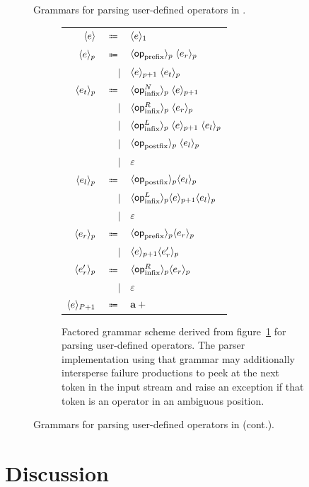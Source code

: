 {\begin{figure}[H]
\begin{subfigure}{\linewidth}
{}
\label{figure:user-defined-operators-initial-grammar-scheme}
\end{subfigure}
\caption[Grammars for parsing user-defined operators in \Beluga.]{Grammars for parsing user-defined operators in \Beluga.}
\label{figure:user-defined-operators-grammar}
\end{figure}%
\begin{figure}\ContinuedFloat
\begin{subfigure}{\linewidth}
\centering
\begin{tabular}{rrl}
$ \langle e\rangle $ & $ \Coloneqq $ & $ \langle e\rangle_1 $\\
$ \langle e\rangle_p $ & $ \Coloneqq $ & $ \langle\mathsf{op}_{\text{prefix}}\rangle_p \; \langle e_r\rangle_p $\\
& $ \mid $ & $ \langle e\rangle_{p + 1} \; \langle e_t\rangle_p $\\
$ \langle e_t\rangle_p $ & $ \Coloneqq $ & $ \langle\mathsf{op}_{\text{infix}}^N\rangle_p \; \langle e\rangle_{p + 1} $\\
& $ \mid $ & $ \langle\mathsf{op}_{\text{infix}}^R\rangle_p \; \langle e_r\rangle_p $\\
& $ \mid $ & $ \langle\mathsf{op}_{\text{infix}}^L\rangle_p \; \langle e\rangle_{p + 1} \; \langle e_l\rangle_p $\\
& $ \mid $ & $ \langle\mathsf{op}_{\text{postfix}}\rangle_p \; \langle e_l\rangle_p $\\
& $ \mid $ & $ \varepsilon $\\
$ \langle e_l\rangle_p $ & $ \Coloneqq $ & $ \langle\mathsf{op}_{\text{postfix}}\rangle_p \langle e_l\rangle_p $\\
& $ \mid $ & $ \langle\mathsf{op}_{\text{infix}}^L\rangle_p \langle e\rangle_{p + 1} \langle e_l\rangle_p $\\
& $ \mid $ & $ \varepsilon $\\
$ \langle e_r\rangle_p $ & $ \Coloneqq $ & $ \langle\mathsf{op}_{\text{prefix}}\rangle_p \langle e_r\rangle_p $\\
& $ \mid $ & $ \langle e\rangle_{p + 1} \langle e_r'\rangle_p $\\
$ \langle e_r'\rangle_p $ & $ \Coloneqq $ & $ \langle\mathsf{op}_{\text{infix}}^R\rangle_p \langle e_r\rangle_p $\\
& $ \mid $ & $ \varepsilon $\\
$ \langle e\rangle_{P + 1} $ & $ \Coloneqq $ & $ \mathbf{a}+ $
\end{tabular}
\caption{Factored grammar scheme derived from figure~\ref{figure:user-defined-operators-initial-grammar-scheme} for parsing user-defined operators. The parser implementation using that grammar may additionally intersperse failure productions to peek at the next token in the input stream and raise an exception if that token is an operator in an ambiguous position.}
\label{figure:user-defined-operators-final-grammar-scheme}
\end{subfigure}
\caption[]{Grammars for parsing user-defined operators in \Beluga (cont.).}
\end{figure}}

\section{Discussion}

